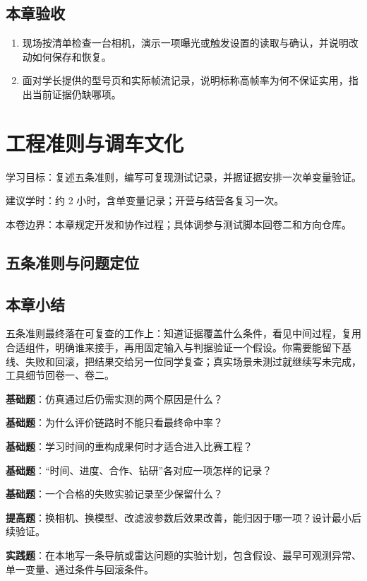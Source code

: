 \documentclass[
  lang=cn,
  scheme=chinese,
  chinesefont=ctexfont,
  11pt,
  oneside,
  device=normal,
  color=cyan,
  mode=fancy
]{elegantbook}
\begin{document}
\section{本章验收}
\begin{enumerate}
  \item 现场按清单检查一台相机，演示一项曝光或触发设置的读取与确认，并说明改动如何保存和恢复。
  \item 面对学长提供的型号页和实际帧流记录，说明标称高帧率为何不保证实用，指出当前证据仍缺哪项。
\end{enumerate}

\chapter{工程准则与调车文化}
\begin{introduction}
  \item 学习目标：复述五条准则，编写可复现测试记录，并据证据安排一次单变量验证。
  \item 建议学时：约 2 小时，含单变量记录；开营与结营各复习一次。
  \item 本卷边界：本章规定开发和协作过程；具体调参与测试脚本回卷二和方向仓库。
\end{introduction}
\label{ch:v3-engineering}

\section{五条准则与问题定位}

\section{本章小结}
\begin{conclusion}
五条准则最终落在可复查的工作上：知道证据覆盖什么条件，看见中间过程，复用合适组件，明确谁来接手，再用固定输入与判据验证一个假设。你需要能留下基线、失败和回滚，把结果交给另一位同学复查；真实场景未测过就继续写未完成，工具细节回卷一、卷二。
\end{conclusion}

\begin{problemset}
\item \label{v3-prob-engineering-1}\textbf{基础题}：仿真通过后仍需实测的两个原因是什么？
\item \label{v3-prob-engineering-2}\textbf{基础题}：为什么评价链路时不能只看最终命中率？
\item \label{v3-prob-engineering-3}\textbf{基础题}：学习时间的重构成果何时才适合进入比赛工程？
\item \label{v3-prob-engineering-4}\textbf{基础题}：“时间、进度、合作、钻研”各对应一项怎样的记录？
\item \label{v3-prob-engineering-5}\textbf{基础题}：一个合格的失败实验记录至少保留什么？
\item \label{v3-prob-engineering-6}\textbf{提高题}：换相机、换模型、改滤波参数后效果改善，能归因于哪一项？设计最小后续验证。
\item \label{v3-prob-engineering-7}\textbf{实践题}：在本地写一条导航或雷达问题的实验计划，包含假设、最早可观测异常、单一变量、通过条件与回滚条件。
\end{problemset}
\end{document}
